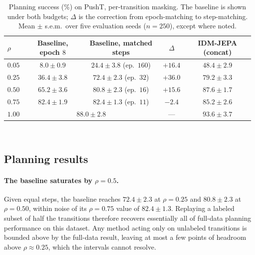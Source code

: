 \documentclass{article}
\begin{document}
\begin{table}[t]
  \centering
  \small
  \caption{Planning success (\%) on PushT, per-transition masking. The baseline
    is shown under both budgets; $\Delta$ is the correction from epoch-matching to
    step-matching. Mean $\pm$ s.e.m.\ over five evaluation seeds
    ($n = 250$), except where noted.}
  \label{tab:budget}
  \begin{tabular}{lcccc}
    \toprule
    $\rho$ & Baseline, epoch $8$ & Baseline, matched steps & $\Delta$ & IDM-JEPA (concat) \\
    \midrule
    $0.05$ & $8.0 \pm 0.9$  & $24.4 \pm 3.8$ (ep.\ $160$) & $+16.4$ & $48.4 \pm 2.9$ \\
    $0.25$ & $36.4 \pm 3.8$ & $72.4 \pm 2.3$ (ep.\ $32$)  & $+36.0$ & $79.2 \pm 3.3$ \\
    $0.50$ & $65.2 \pm 3.6$ & $80.8 \pm 2.3$ (ep.\ $16$)  & $+15.6$ & $87.6 \pm 1.7$ \\
    $0.75$ & $82.4 \pm 1.9$ & $82.4 \pm 1.3$ (ep.\ $11$) & $-2.4$ & $85.2 \pm 2.6$ \\
    $1.00$ & \multicolumn{2}{c}{$88.0 \pm 2.8$} & --- & $93.6 \pm 3.7$ \\
    \bottomrule
  \end{tabular}
  \\[2pt]
\end{table}


\subsection{Planning results}
\label{sec:results-planning}


\paragraph{The baseline saturates by $\rho = 0.5$.}
Given equal steps, the baseline reaches $72.4 \pm 2.3$ at $\rho = 0.25$ and
$80.8 \pm 2.3$ at $\rho = 0.50$, within noise of its $\rho = 0.75$ value of
$82.4 \pm 1.3$.
Replaying a labeled subset of half the transitions therefore recovers essentially all
of full-data planning performance on this dataset. Any method acting only on
unlabeled transitions is bounded above by the full-data result, leaving at most a few
points of headroom above $\rho \approx 0.25$, which the intervals cannot resolve.
\end{document}
